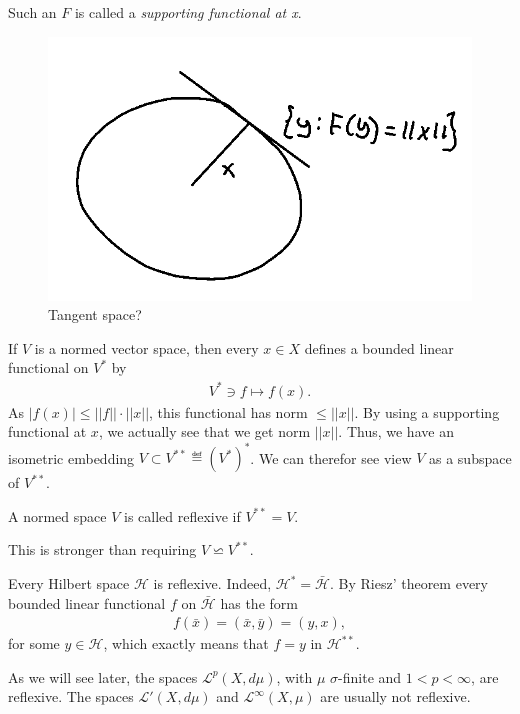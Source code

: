Such an \(F\) is called a \emph{supporting functional at x}.
\begin{figure}[H]
    \centering
    \includegraphics[scale=0.4]{Figs/hanah_banach1.png}
    \caption{Tangent space?}
\end{figure}
If \(V\) is a normed vector space, then every \(x\in X\) defines a bounded linear functional on \(V^*\) by 
\begin{align*}
    V^*\ni f\mapsto f(x).
\end{align*}
As \(|f(x)|\leq ||f||\cdot ||x||\), this functional has norm \(\leq ||x||\). By using a supporting functional at \(x\), we actually see that
we get norm \(||x||\). Thus, we have an isometric embedding \(V\subset V^{**}\eqdef (V^*)^*\). We can therefor see view \(V\) as a subspace
of \(V^{**}\).
\begin{definition}
    A normed space \(V\) is called reflexive if \(V^{**}=V\).
\end{definition}
\begin{remark}
    This is stronger than requiring \(V\backsimeq V^{**}\).
\end{remark}
\begin{remark}
    Every Hilbert space \(\mathcal{H}\) is reflexive. Indeed, \(\mathcal{H}^*=\bar{\mathcal{H}}\). By Riesz' theorem every bounded linear 
    functional \(f\) on \(\bar{\mathcal{H}}\) has the form
    \begin{align*}
        f(\bar{x}) = (\bar{x}, \bar{y}) = (y,x),
    \end{align*}
    for some \(y\in\mathcal{H}\), which exactly means that \(f=y\) in \(\mathcal{H}^{**}\).

    As we will see later, the spaces \(\mathcal{L}^{p}(X,d\mu)\), with \(\mu\) \(\sigma\)-finite and \(1<p<\infty\), are reflexive. The spaces
    \(\mathcal{L}'(X, d\mu)\) and \(\mathcal{L}^{\infty}(X,\mu)\) are usually not reflexive.
\end{remark}